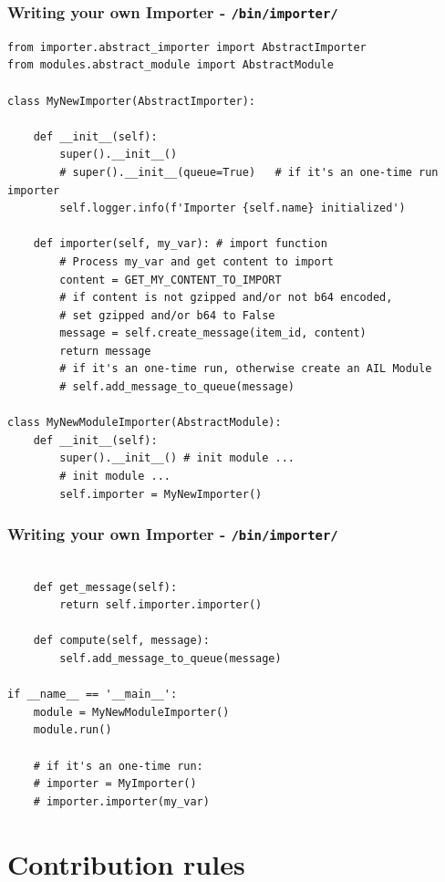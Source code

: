 \documentclass[aspectratio=169]{beamer}
\begin{document}
\lstset{style=code}
\begin{frame}[fragile]
    \frametitle{Writing your own Importer - \texttt{/bin/importer/}}
    \begin{lstlisting}
from importer.abstract_importer import AbstractImporter
from modules.abstract_module import AbstractModule

class MyNewImporter(AbstractImporter):

    def __init__(self):
        super().__init__()
        # super().__init__(queue=True)   # if it's an one-time run importer
        self.logger.info(f'Importer {self.name} initialized')

    def importer(self, my_var): # import function
        # Process my_var and get content to import
        content = GET_MY_CONTENT_TO_IMPORT
        # if content is not gzipped and/or not b64 encoded,
        # set gzipped and/or b64 to False
        message = self.create_message(item_id, content)
        return message
        # if it's an one-time run, otherwise create an AIL Module
        # self.add_message_to_queue(message)

class MyNewModuleImporter(AbstractModule):
    def __init__(self):
        super().__init__() # init module ...
        # init module ...
        self.importer = MyNewImporter()

    \end{lstlisting}
\end{frame}

\begin{frame}[fragile]
    \frametitle{Writing your own Importer - \texttt{/bin/importer/}}
    \begin{lstlisting}

    def get_message(self):
        return self.importer.importer()

    def compute(self, message):
        self.add_message_to_queue(message)

if __name__ == '__main__':
    module = MyNewModuleImporter()
    module.run()

    # if it's an one-time run:
    # importer = MyImporter()
    # importer.importer(my_var)

    \end{lstlisting}
\end{frame}

\section{Contribution rules}
\end{document}
